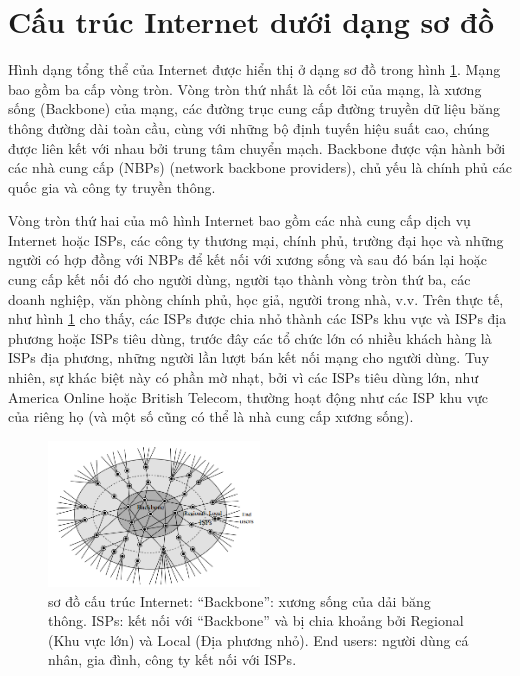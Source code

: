 \section{Cấu trúc Internet dưới dạng sơ đồ}
Hình dạng tổng thể của Internet được hiển thị ở dạng sơ đồ trong hình \ref{fig:h21}. Mạng bao gồm ba cấp vòng tròn. Vòng tròn thứ nhất là cốt lõi của mạng, là xương sống (Backbone) của mạng, các đường trục cung cấp đường truyền dữ liệu băng thông đường dài toàn cầu, cùng với những bộ định tuyến hiệu suất cao, chúng được liên kết với nhau bởi trung tâm chuyển mạch. Backbone được vận hành bởi các nhà cung cấp (NBPs) (network backbone providers), chủ yếu là chính phủ các quốc gia và công ty truyền thông. \par
Vòng tròn thứ hai của mô hình Internet bao gồm các nhà cung cấp dịch vụ Internet hoặc ISPs, các công ty thương mại, chính phủ, trường đại học và những người có hợp đồng với NBPs để kết nối với xương sống và sau đó bán lại hoặc cung cấp kết nối đó cho người dùng, người tạo thành vòng tròn thứ ba, các doanh nghiệp, văn phòng chính phủ, học giả, người trong nhà, v.v. Trên thực tế, như hình \ref{fig:h21} cho thấy, các ISPs được chia nhỏ thành các ISPs khu vực và ISPs địa phương hoặc ISPs tiêu dùng, trước đây các tổ chức lớn có nhiều khách hàng là ISPs địa phương, những người lần lượt bán kết nối mạng cho người dùng. Tuy nhiên, sự khác biệt này có phần mờ nhạt, bởi vì các ISPs tiêu dùng lớn, như America Online hoặc British Telecom, thường hoạt động như các ISP khu vực của riêng họ (và một số cũng có thể là nhà cung cấp xương sống).
\begin{figure}[ht]
\centering
	\includegraphics[width=0.5\textwidth]{res/h21.png}
	\caption{sơ đồ cấu trúc Internet: “Backbone”: xương sống của dải băng thông. ISPs: kết nối với “Backbone” và bị chia khoảng bởi Regional (Khu vực lớn) và Local (Địa phương nhỏ). End users: người dùng cá nhân, gia đình, công ty kết nối với ISPs.}
	\label{fig:h21}
\end{figure}

